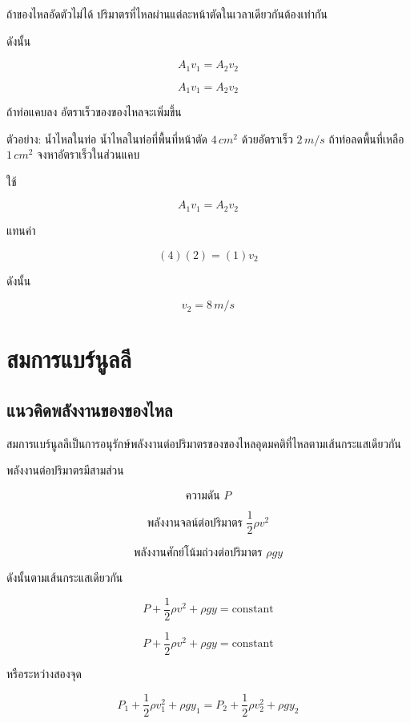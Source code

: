 ถ้าของไหลอัดตัวไม่ได้ ปริมาตรที่ไหลผ่านแต่ละหน้าตัดในเวลาเดียวกันต้องเท่ากัน

ดังนั้น

\[
A_1v_1=A_2v_2
\]

\begin{tcolorbox}[title=สมการความต่อเนื่อง]
\[
A_1v_1=A_2v_2
\]

ถ้าท่อแคบลง อัตราเร็วของของไหลจะเพิ่มขึ้น
\end{tcolorbox}

\begin{examplebox}{ตัวอย่าง: น้ำไหลในท่อ}
น้ำไหลในท่อที่พื้นที่หน้าตัด $4\,\si{cm^2}$ ด้วยอัตราเร็ว $2\,\si{m/s}$ ถ้าท่อลดพื้นที่เหลือ $1\,\si{cm^2}$ จงหาอัตราเร็วในส่วนแคบ

ใช้

\[
A_1v_1=A_2v_2
\]

แทนค่า

\[
(4)(2)=(1)v_2
\]

ดังนั้น

\[
v_2=8\,\si{m/s}
\]
\end{examplebox}

\section{สมการแบร์นูลลี}

\subsection{แนวคิดพลังงานของของไหล}

สมการแบร์นูลลีเป็นการอนุรักษ์พลังงานต่อปริมาตรของของไหลอุดมคติที่ไหลตามเส้นกระแสเดียวกัน

พลังงานต่อปริมาตรมีสามส่วน

\[
\text{ความดัน }P
\]

\[
\text{พลังงานจลน์ต่อปริมาตร } \frac{1}{2}\rho v^2
\]

\[
\text{พลังงานศักย์โน้มถ่วงต่อปริมาตร } \rho gy
\]

ดังนั้นตามเส้นกระแสเดียวกัน

\[
P+\frac{1}{2}\rho v^2+\rho gy=\text{constant}
\]

\begin{tcolorbox}[title=สมการแบร์นูลลี]
\[
P+\frac{1}{2}\rho v^2+\rho gy=\text{constant}
\]

หรือระหว่างสองจุด

\[
P_1+\frac{1}{2}\rho v_1^2+\rho gy_1
=
P_2+\frac{1}{2}\rho v_2^2+\rho gy_2
\]
\end{tcolorbox}

